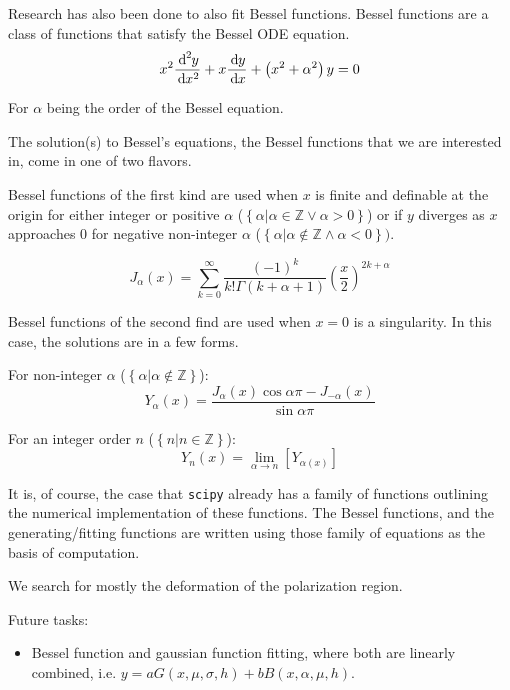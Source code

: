 \documentclass[twocolumn]{article}
\begin{document}
Research has also been done to also fit Bessel functions. Bessel functions are a class of functions that satisfy the Bessel ODE equation.
\begin{equation}
	x^2 \frac{\diff[2]{y}}{\diff{x^2}} + x \frac{\diff{y}}{\diff{x}} + \left( x^2 + \alpha^2 \right) y = 0
	\label{eq:Bessel_ODE_equation}
\end{equation}

For $\alpha$ being the order of the Bessel equation. 

The solution(s) to Bessel's equations, the Bessel functions that we are interested in, come in one of two flavors. 

Bessel functions of the first kind are used when $x$ is finite and definable at the origin for either integer or positive $\alpha$ ($\left\{ \left. \alpha \right| \alpha \in \mathbb{Z} \lor \alpha > 0 \right\}$) or if $y$ diverges as $x$ approaches $0$ for negative non-integer $\alpha$ ($\left\{ \left. \alpha \right| \alpha \notin \mathbb{Z} \land \alpha < 0\right\})$.

\begin{equation}
	J_{\alpha}(x) = \sum_{k=0}^{\infty} \frac{\left(-1\right)^{k}}{k! \Gamma(k+\alpha+1)} \left( \frac{x}{2} \right)^{2k + \alpha}
	\label{eq:Bessel_equation_firstkind}
\end{equation}

Bessel functions of the second find are used when $x=0$ is a singularity. In this case, the solutions are in a few forms.

For non-integer $\alpha$ ($\left\{ \left. \alpha \right| \alpha \notin \mathbb{Z} \right\}$):
\begin{equation}
	Y_{\alpha}(x) = \frac{J_{\alpha}(x) \cos{\alpha \pi} - J_{-\alpha}(x)}{\sin{\alpha\pi}}
	\label{eq:Bessel_equation_secondkind_noninterger}
\end{equation}

For an integer order $n$ ($\left\{ \left. n \right| n \in \mathbb{Z} \right\}$):
\begin{equation}
	Y_{n}(x) = \lim_{\alpha \rightarrow n} \left[ {Y_{\alpha(x)}} \right]
	\label{eq:Bessel_equation_secondkind_interger}
\end{equation}

It is, of course, the case that \texttt{scipy} already has a family of functions outlining the numerical implementation of these functions. The Bessel functions, and the generating/fitting functions are written using those family of equations as the basis of computation. 


\begin{meetingnotes*}
	We search for mostly the deformation of the polarization region. 

	Future tasks:
	\begin{itemize}
		\item Bessel function and gaussian function fitting, where both are linearly combined, i.e. $y = a G(x,\mu,\sigma,h) + b B(x,\alpha,\mu,h)$.
	\end{itemize}
\end{meetingnotes*}
\end{document}
